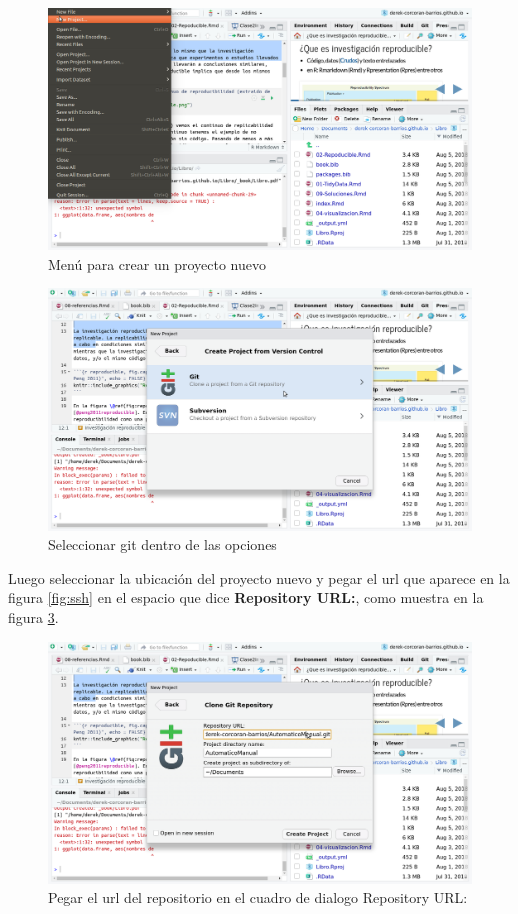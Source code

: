 \documentclass[]{book}
\begin{document}
\begin{figure}

{\centering \includegraphics[width=0.8\linewidth]{NewProject} 

}

\caption{Menú para crear un proyecto nuevo}\label{fig:NewProject}
\end{figure}

\begin{figure}

{\centering \includegraphics[width=0.8\linewidth]{Git} 

}

\caption{Seleccionar git dentro de las opciones}\label{fig:Git}
\end{figure}

Luego seleccionar la ubicación del proyecto nuevo y pegar el url que
aparece en la figura \ref{fig:ssh} en el espacio que dice
\textbf{Repository URL:}, como muestra en la figura
\ref{fig:GitRstudio}.

\begin{figure}

{\centering \includegraphics[width=0.8\linewidth]{GitRstudio} 

}

\caption{Pegar el url del repositorio en el cuadro de dialogo Repository URL:}\label{fig:GitRstudio}
\end{figure}
\end{document}
